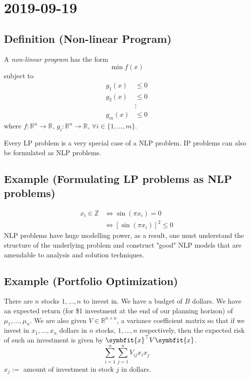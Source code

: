 \section{2019-09-19}
\begin{defbox}
    \subsection{Definition (Non-linear Program)}
    A \emph{non-linear program} has the form
    \[\min f(x)\]
subject to
\begin{align*}
    g_1(x)&\le 0\\
    g_2(x)&\le 0\\
    &\vdots\\
    g_m(x)&\le 0
\end{align*}
where
$f:\mathbb{R}^n\rightarrow \mathbb{R}$, 
$g_i:\mathbb{R}^n\rightarrow\mathbb{R}$, $\forall i\in\{1,\dots,m\}$.
\end{defbox}

Every LP problem is a very special case of a NLP problem. IP problems can
also be formulated as NLP problems.
\subsection{Example (Formulating LP problems as NLP problems)}
\begin{align*}
    x_i\in\mathbb{Z}&\iff \sin(\pi x_i)=0\\
    &\iff [\sin(\pi x_i)]^2\le 0
\end{align*}
NLP problems have huge modelling power, as a result, one must understand the
structure of the underlying problem and construct "good" NLP models that are
amendable to analysis and solution techniques.

\subsection{Example (Portfolio Optimization)}
There are $n$ stocks $1,\dots,n$ to invest in. We have a budget of $B$ dollars.
We have an expected return (for \$1 investment at the end of our planning
horizon) of $\mu_1,\dots,\mu_n$. We are also given 
$V\in \mathbb{R}^{n\times n}$, a variance coefficient matrix so that if
we invest in $x_1,\dots,x_n$ dollars in $n$ stocks, $1,\dots,n$ respectively,
then the expected risk of such an investment is given by 
$\symbfit{x}^\top  V\symbfit{x}$.
\[\sum\limits_{i = 1}^{n}\sum\limits_{j = 1}^{n}V_{ij}x_ix_j\]
$x_j:=$ amount of investment in stock $j$ in dollars.

